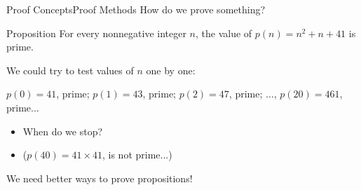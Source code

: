 \begin{frame}{Proof Concepts}{Proof Methods}
  How do we prove something?
  \begin{block}{Proposition}
    For every nonnegative integer $n$, the value of $p(n) = n^2+n+41$ is prime.
  \end{block}\medskip

  We could try to test values of $n$ one by one:
  \begin{center}
    $p(0) = 41$, prime; $p(1) = 43$, prime; $p(2) = 47$, prime; $\ldots$, $p(20) = 461$, prime...
  \end{center}\medskip

  \begin{itemize}
    \item When do we stop?
    \item ($p(40) = 41\times41$, is not prime...)
  \end{itemize}
  We need better ways to prove propositions!
\end{frame}

